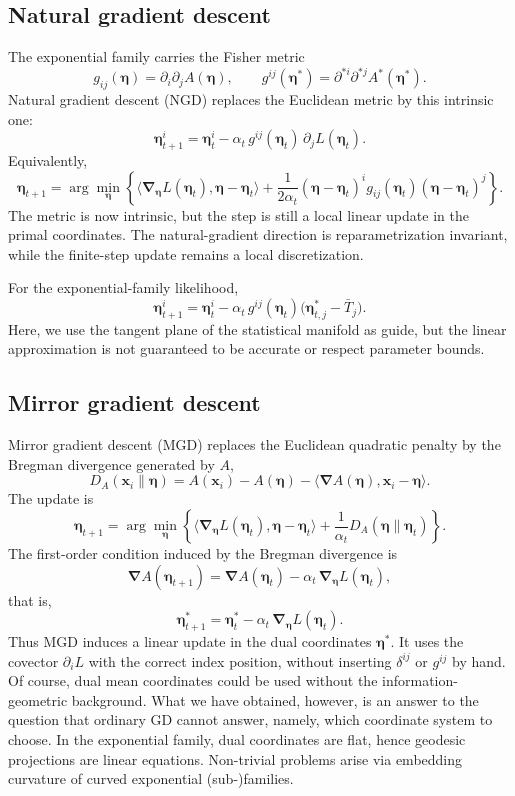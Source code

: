\documentclass[11pt]{article}
\newcommand{\be}{{\bm{\eta}}}
\newcommand{\bx}{\bm{x}}
\newcommand{\bNabla}{\bm{\nabla}}
\begin{document}
\subsection{Natural gradient descent}

The exponential family carries the Fisher metric
\[
g_{ij}(\be)=\partial_i\partial_jA(\be),
\qquad
g^{ij}(\be^\ast)=\partial^{\ast i}\partial^{\ast j}A^\ast(\be^\ast).
\]
Natural gradient descent (NGD) replaces the Euclidean metric by this intrinsic one:
\[
\be^i_{t+1}
=
\be^i_t-\alpha_t\,g^{ij}(\be_t)\,\partial_jL(\be_t).
\]
Equivalently,
\[
\be_{t+1}
=
\arg\min_{\be}
\left\{
\langle \bNabla_\be L(\be_t),\be-\be_t\rangle
+\frac{1}{2\alpha_t}
(\be-\be_t)^i g_{ij}(\be_t)(\be-\be_t)^j
\right\}.
\]
The metric is now intrinsic, but the step is still a local linear update in the primal coordinates. The natural-gradient direction is reparametrization invariant, while the finite-step update remains a local discretization.

For the exponential-family likelihood,
\[
\be^i_{t+1}
=
\be^i_t-\alpha_t\,g^{ij}(\be_t)\bigl(\be^\ast_{t,j}-\bar T_j\bigr).
\]
Here, we use the tangent plane of the statistical manifold as guide, but the linear approximation is not guaranteed to be accurate or respect parameter bounds.

\subsection{Mirror gradient descent}

Mirror gradient descent (MGD) replaces the Euclidean quadratic penalty by the Bregman divergence generated by \(A\),
\[
D_A(\bx_i\|\be)=A(\bx_i)-A(\be)-\langle \bNabla A(\be),\bx_i-\be\rangle.
\]
The update is
\[
\be_{t+1}
=
\arg\min_{\be}
\left\{
\langle \bNabla_\be L(\be_t),\be-\be_t\rangle
+\frac{1}{\alpha_t}D_A(\be\|\be_t)
\right\}.
\]
The first-order condition induced by the Bregman divergence is
\[
\bNabla A(\be_{t+1})=\bNabla A(\be_t)-\alpha_t\,\bNabla_\be L(\be_t),
\]
that is,
\[
\be^\ast_{t+1}=\be^\ast_t-\alpha_t\,\bNabla_\be L(\be_t).
\]
Thus MGD induces a linear update in the dual coordinates \(\be^\ast\). It uses the covector \(\partial_iL\) with the correct index position, without inserting \(\delta^{ij}\) or \(g^{ij}\) by hand. Of course, dual mean coordinates could be used without the information-geometric background. What we have obtained, however, is an answer to the question that ordinary GD cannot answer, namely, which coordinate system to choose. In the exponential family, dual coordinates are flat, hence geodesic projections are linear equations. Non-trivial problems arise via embedding curvature of curved exponential (sub-)families.
\end{document}
